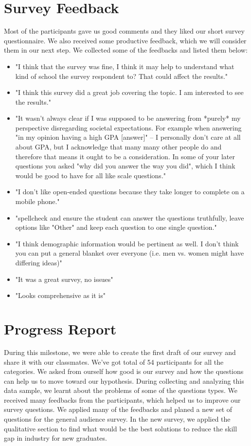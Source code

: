 \documentclass{sigchi}
\begin{document}
\section{Survey Feedback}
Most of the participants gave us good comments and they liked our short survey questionnaire. We also received some productive feedback, which we will consider them in our next step. We collected some of the feedbacks and listed them below:
\begin{itemize}
	\item "I think that the survey was fine, I think it may help to understand what kind of school the survey respondent to? That could affect the results."
	\item "I think this survey did a great job covering the topic. I am interested to see the results."
	\item "It wasn't always clear if I was supposed to be answering from *purely* my perspective disregarding societal expectations. For example when answering "in my opinion having a high GPA [answer]" -- I personally don't care at all about GPA, but I acknowledge that many many other people do and therefore that means it ought to be a consideration. In some of your later questions you asked "why did you answer the way you did", which I think would be good to have for all like scale questions."
	\item "I don't like open-ended questions because they take longer to complete on a mobile phone."
	\item "spellcheck and ensure the student can answer the questions truthfully, leave options like "Other" and keep each question to one single question."
	\item "I think demographic information would be pertinent as well. I don't think you can put a general blanket over everyone (i.e. men vs. women might have differing ideas)"
	\item "It was a great survey, no issues"
	\item "Looks comprehensive as it is"
\end{itemize}


\section{Progress Report}
During this milestone, we were able to create the first draft of our survey and share it with our classmates. We've got total of 54 participants for all the categories. We asked from ourself how good is our survey and how the questions can help us to move toward our hypothesis. During collecting and analyzing this data sample, we learnt about the problems of some of the questions types. 
We received many feedbacks from the participants, which helped us to improve our survey questions. We applied many of the feedbacks and planed a new set of questions for the general audience survey. In the new survey, we applied the qualitative section to find what would be the best solutions to reduce the skill gap in industry for new graduates.
\end{document}
